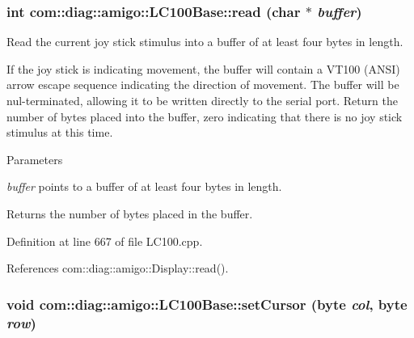 \hypertarget{classcom_1_1diag_1_1amigo_1_1LC100Base_a2bbb2cc266ee6a1b9194f12c1ce9c1bf}{
\subsubsection[{read}]{\setlength{\rightskip}{0pt plus 5cm}int com::diag::amigo::LC100Base::read (char $\ast$ {\em buffer})}}
\label{classcom_1_1diag_1_1amigo_1_1LC100Base_a2bbb2cc266ee6a1b9194f12c1ce9c1bf}


Read the current joy stick stimulus into a buffer of at least four bytes in length. 

If the joy stick is indicating movement, the buffer will contain a VT100 (ANSI) arrow escape sequence indicating the direction of movement. The buffer will be nul-\/terminated, allowing it to be written directly to the serial port. Return the number of bytes placed into the buffer, zero indicating that there is no joy stick stimulus at this time. 
\begin{DoxyParams}{Parameters}
\item[{\em buffer}]points to a buffer of at least four bytes in length. \end{DoxyParams}
\begin{DoxyReturn}{Returns}
the number of bytes placed in the buffer. 
\end{DoxyReturn}


Definition at line 667 of file LC100.cpp.



References com::diag::amigo::Display::read().

\hypertarget{classcom_1_1diag_1_1amigo_1_1LC100Base_aadfb19a306738b52afb990734a412b94}{
\subsubsection[{setCursor}]{\setlength{\rightskip}{0pt plus 5cm}void com::diag::amigo::LC100Base::setCursor (byte {\em col}, \/  byte {\em row})}}
\label{classcom_1_1diag_1_1amigo_1_1LC100Base_aadfb19a306738b52afb990734a412b94}


